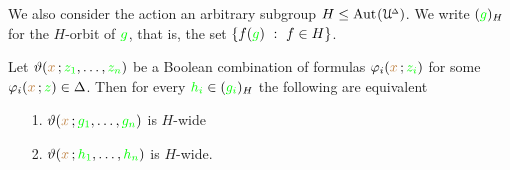 





We also consider the action an arbitrary subgroup $H\le{\rm Aut\kern.15ex}(\EuScript U\kern-.2ex^{\scriptscriptstyle\Delta})$.
We write \emph{$({\color{green} g})_H$\/} for the $H$-orbit of ${\color{green} g}$, that is, the set $\{f({\color{green} g})\ :\ f\in H\}$.

\begin{proposition}\label{prop_wideHcojugate}
  Let $\vartheta({\color{brown} x}\,;{\color{green} z_1},\dots,{\color{green} z_n})$ be a Boolean combination of formulas $\varphi_i({\color{brown} x}\,;{\color{green} z_i})$ for some $\varphi_i({\color{brown} x}\,;{\color{green} z})\in\Delta$.
  Then for every ${\color{green} h_i}\in({\color{green} g_i})_H$ the following are equivalent
  \begin{itemize}
    \item [1.] $\vartheta({\color{brown} x}\,;{\color{green} g_1},\dots,{\color{green} g_n})$ is $H$-wide
    \item [2.] $\vartheta({\color{brown} x}\,;{\color{green} h_1},\dots,{\color{green} h_n})$ is $H$-wide.
  \end{itemize}
\end{proposition}

